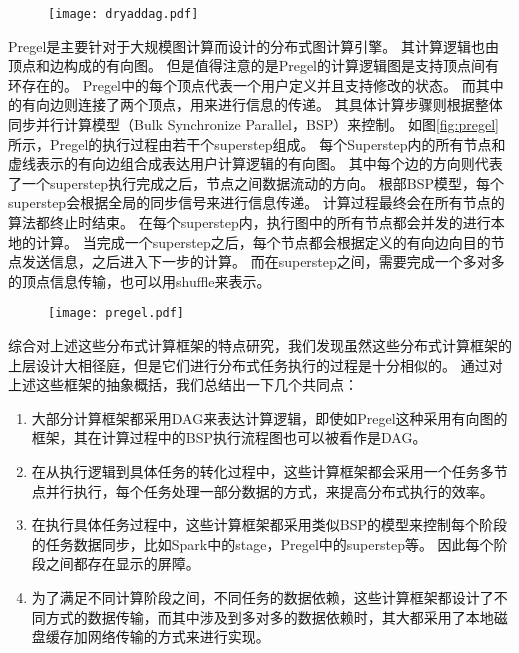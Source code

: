 \begin{figure}[!htp]
    \centering
    \texttt{[image: dryaddag.pdf]}
\end{figure}

Pregel\cite{pregel}是主要针对于大规模图计算而设计的分布式图计算引擎。
其计算逻辑也由顶点和边构成的有向图。
但是值得注意的是Pregel的计算逻辑图是支持顶点间有环存在的。
Pregel中的每个顶点代表一个用户定义并且支持修改的状态。
而其中的有向边则连接了两个顶点，用来进行信息的传递。
其具体计算步骤则根据整体同步并行计算模型（Bulk Synchronize Parallel，BSP）来控制。
如图\ref{fig:pregel}所示，Pregel的执行过程由若干个superstep组成。
每个Superstep内的所有节点和虚线表示的有向边组合成表达用户计算逻辑的有向图。
其中每个边的方向则代表了一个superstep执行完成之后，节点之间数据流动的方向。
根部BSP模型，每个superstep会根据全局的同步信号来进行信息传递。
计算过程最终会在所有节点的算法都终止时结束。
在每个superstep内，执行图中的所有节点都会并发的进行本地的计算。
当完成一个superstep之后，每个节点都会根据定义的有向边向目的节点发送信息，之后进入下一步的计算。
而在superstep之间，需要完成一个多对多的顶点信息传输，也可以用shuffle来表示。

\begin{figure}[!htp]
    \centering
    \texttt{[image: pregel.pdf]}
\end{figure}

综合对上述这些分布式计算框架的特点研究，我们发现虽然这些分布式计算框架的上层设计大相径庭，但是它们进行分布式任务执行的过程是十分相似的。
通过对上述这些框架的抽象概括，我们总结出一下几个共同点：

\begin{enumerate}
	\item 大部分计算框架都采用DAG来表达计算逻辑，即使如Pregel这种采用有向图的框架，其在计算过程中的BSP执行流程图也可以被看作是DAG。
	\item 在从执行逻辑到具体任务的转化过程中，这些计算框架都会采用一个任务多节点并行执行，每个任务处理一部分数据的方式，来提高分布式执行的效率。
	\item 在执行具体任务过程中，这些计算框架都采用类似BSP的模型来控制每个阶段的任务数据同步，比如Spark中的stage，Pregel中的superstep等。
	因此每个阶段之间都存在显示的屏障。
	\item 为了满足不同计算阶段之间，不同任务的数据依赖，这些计算框架都设计了不同方式的数据传输，而其中涉及到多对多的数据依赖时，其大都采用了本地磁盘缓存加网络传输的方式来进行实现。 
\end{enumerate}


